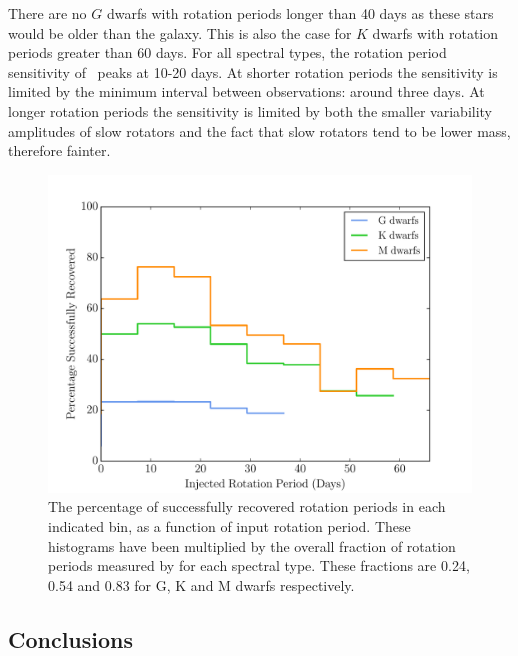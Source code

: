 There are no $G$ dwarfs with rotation periods longer than 40 days as these
stars would be older than the galaxy.
This is also the case for $K$ dwarfs with rotation periods greater than 60
days.
For all spectral types, the rotation period sensitivity of \LSST\ peaks at
10-20 days.
At shorter rotation periods the sensitivity is limited by the minimum interval
between observations: around three days.
At longer rotation periods the sensitivity is limited by both the smaller
variability amplitudes of slow rotators and the fact that slow rotators tend
to be lower mass, therefore fainter.

\begin{figure}
\begin{center}
\includegraphics[width=6in, clip=true]{figures/recovered_hist_-10.pdf}
\caption[\LSST\ rotation period recovery results for different spectral types]
{The percentage of successfully recovered rotation periods in each indicated
bin, as a function of input rotation period.
These histograms have been multiplied by the overall fraction of rotation
periods measured by \citet{Mcquillan2014} for each spectral type.
These fractions are 0.24, 0.54 and 0.83 for G, K and M dwarfs respectively.}
\label{fig:kickass}
\end{center}
\end{figure}

\subsection{Conclusions}

